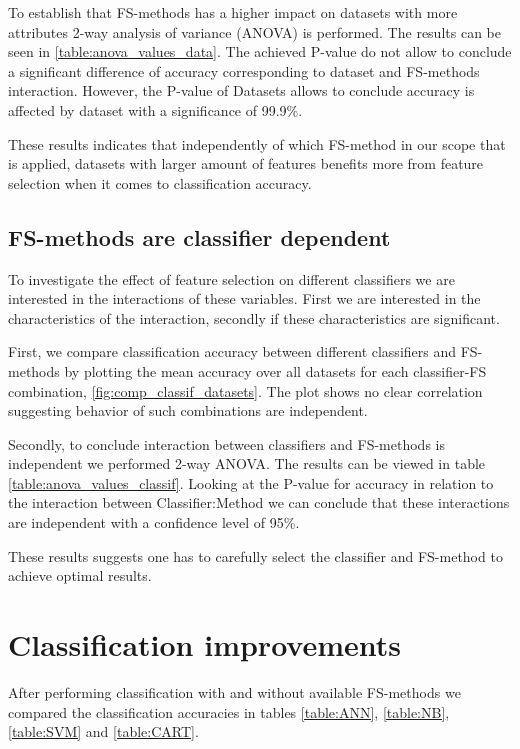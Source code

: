 To establish that FS-methods has a higher impact on datasets with more attributes 2-way analysis of variance (ANOVA) is performed. The results can be seen in \ref{table:anova_values_data}. The achieved P-value do not allow to conclude a significant difference of accuracy corresponding to dataset and FS-methods interaction. However, the P-value of Datasets allows to conclude accuracy is affected by dataset with a significance of 99.9\%.



These results indicates that independently of which FS-method in our scope that is applied, datasets with larger amount of features benefits more from feature selection when it comes to classification accuracy.

\subsection{FS-methods are classifier dependent}

To investigate the effect of feature selection on different classifiers we are interested in the interactions of these variables. First we are interested in the characteristics of the interaction, secondly if these characteristics are significant.

First, we compare classification accuracy between different classifiers and FS-methods by plotting the mean accuracy over all datasets for each classifier-FS combination, \ref{fig:comp_classif_datasets}. The plot shows no clear correlation suggesting behavior of such combinations are independent.

Secondly, to conclude interaction between classifiers and FS-methods is independent we performed 2-way ANOVA. The results can be viewed in table \ref{table:anova_values_classif}. Looking at the P-value for accuracy in relation to the interaction between Classifier:Method we can conclude that these interactions are independent with a confidence level of 95\%.



These results suggests one has to carefully select the classifier and FS-method to achieve optimal results.


\section{Classification improvements}

After performing classification with and without available FS-methods we compared the classification accuracies in tables \ref{table:ANN}, \ref{table:NB}, \ref{table:SVM} and \ref{table:CART}.

